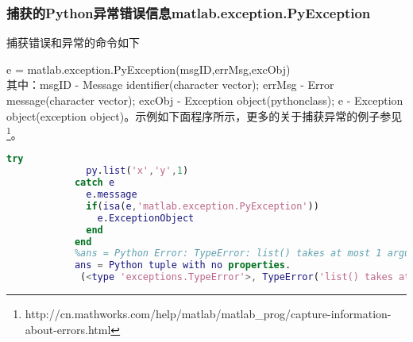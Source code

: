        \subsubsection{捕获的Python异常错误信息matlab.exception.PyException}
            \par
            捕获错误和异常的命令如下
            \par
            e = matlab.exception.PyException(msgID,errMsg,excObj)\\
            其中：msgID - Message identifier(character vector); errMsg - Error message(character vector); excObj - Exception object(pythonclass); e - Exception object(exception object)。示例如下面程序所示，更多的关于捕获异常的例子参见\footnote{http://cn.mathworks.com/help/matlab/matlab\_prog/capture-information-about-errors.html}。
            \begin{lstlisting}[language = Matlab]
            try
              py.list('x','y',1)
            catch e
              e.message
              if(isa(e,'matlab.exception.PyException'))
                e.ExceptionObject
              end
            end
            %ans = Python Error: TypeError: list() takes at most 1 argument (3 given)
            ans = Python tuple with no properties.
             (<type 'exceptions.TypeError'>, TypeError('list() takes at most 1 argument (3 given)',), None)
            \end{lstlisting}
